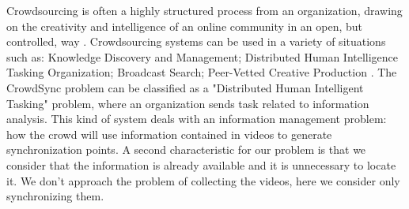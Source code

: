 
Crowdsourcing is often a highly structured process from an organization, drawing on the creativity and intelligence of an online community in an open, but controlled, way \cite{brabham2014crowdsourcing}. Crowdsourcing systems can be used in a variety of situations such as: Knowledge Discovery and Management; Distributed Human Intelligence Tasking Organization; Broadcast Search; Peer-Vetted Creative Production \cite{brabham2014crowdsourcing}. The CrowdSync problem can be classified as a "Distributed Human Intelligent Tasking" problem, where an organization sends task related to information analysis. This kind of system deals with an information management problem: how the crowd will use information contained in videos to generate synchronization points. A second characteristic for our problem is that we consider that the information is already available and it is unnecessary to locate it. We don't approach the problem of collecting the videos, here we consider only synchronizing them.




